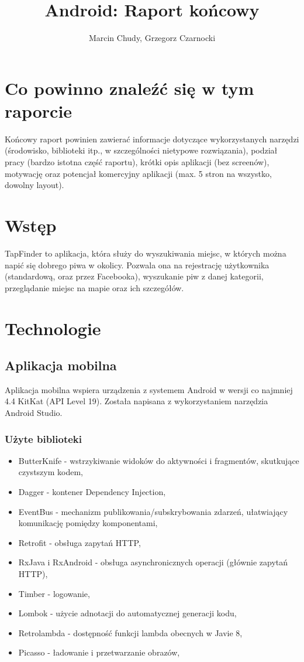 \documentclass[a4paper]{article}
\title{Android: Raport końcowy}
\author{Marcin Chudy, Grzegorz Czarnocki}
\begin{document}
\maketitle

\section{Co powinno znaleźć się w tym raporcie}

Końcowy raport powinien zawierać informacje dotyczące wykorzystanych narzędzi (środowisko, biblioteki itp., w szczególności nietypowe rozwiązania), podział pracy (bardzo istotna część raportu), krótki opis aplikacji (bez screenów), motywację oraz potencjał komercyjny aplikacji (max. 5 stron na wszystko, dowolny layout).

\section{Wstęp}

TapFinder to aplikacja, która służy do wyszukiwania miejsc, w których można napić się dobrego piwa w okolicy. Pozwala ona na rejestrację użytkownika (standardową, oraz przez Facebooka), wyszukanie piw z danej kategorii, przeglądanie miejsc na mapie oraz ich szczegółów.

\section{Technologie}

\subsection{Aplikacja mobilna}
Aplikacja mobilna wspiera urządzenia z systemem Android w wersji co najmniej 4.4 KitKat (API Level 19). Została napisana z wykorzystaniem narzędzia Android Studio.

\subsubsection{Użyte biblioteki}
\begin{itemize}
\item ButterKnife - wstrzykiwanie widoków do aktywności i fragmentów, skutkujące czystszym kodem,
\item Dagger - kontener Dependency Injection,
\item EventBus - mechanizm publikowania/subskrybowania zdarzeń, ułatwiający komunikację pomiędzy komponentami,
\item Retrofit - obsługa zapytań HTTP,
\item RxJava i RxAndroid - obsługa asynchronicznych operacji (głównie zapytań HTTP),
\item Timber - logowanie,
\item Lombok - użycie adnotacji do automatycznej generacji kodu,
\item Retrolambda - dostępność funkcji lambda obecnych w Javie 8,
\item Picasso - ładowanie i przetwarzanie obrazów,
\end{itemize}
\end{document}
